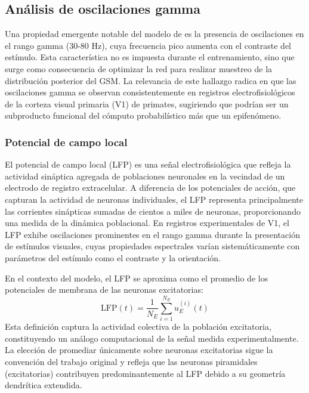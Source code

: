 \subsection{Análisis de oscilaciones gamma}
  \label{subsec:res_gamma}
  Una propiedad emergente notable del modelo de \citet{echeveste2020cortical} es la presencia de
  oscilaciones en el rango gamma (30-80 Hz), cuya frecuencia pico aumenta con el contraste del
  estímulo. Esta característica no es impuesta durante el entrenamiento, sino que surge como
  consecuencia de optimizar la red para realizar muestreo de la distribución posterior del
  \acrshort{GSM}. La relevancia de este hallazgo radica en que las oscilaciones gamma se observan
  consistentemente en registros electrofisiológicos de la corteza visual primaria (\acrshort{V1}) de
  primates, sugiriendo que podrían ser un subproducto funcional del cómputo probabilístico más que un
  epifenómeno.

  \subsubsection{Potencial de campo local}
  El potencial de campo local (\acrshort{LFP}) es una señal electrofisiológica que refleja la 
  actividad sináptica agregada de poblaciones neuronales en la vecindad de un electrodo de registro 
  extracelular. A diferencia de los potenciales de acción, que capturan la actividad de neuronas 
  individuales, el \acrshort{LFP} representa principalmente las corrientes sinápticas sumadas de 
  cientos a miles de neuronas, proporcionando una medida de la dinámica poblacional. En registros 
  experimentales de \acrshort{V1}, el \acrshort{LFP} exhibe oscilaciones prominentes en el rango 
  gamma durante la presentación de estímulos visuales, cuyas propiedades espectrales varían 
  sistemáticamente con parámetros del estímulo como el contraste y la orientación.

  En el contexto del modelo, el \acrshort{LFP} se aproxima como el promedio de los potenciales de 
  membrana de las neuronas excitatorias:
  \begin{equation}
      \text{LFP}(t) = \frac{1}{N_E} \sum_{i=1}^{N_E} u_E^{(i)}(t)
  \end{equation}
  Esta definición captura la actividad colectiva de la población excitatoria, constituyendo un 
  análogo computacional de la señal medida experimentalmente. La elección de promediar únicamente 
  sobre neuronas excitatorias sigue la convención del trabajo original y refleja que las neuronas 
  piramidales (excitatorias) contribuyen predominantemente al \acrshort{LFP} debido a su geometría 
  dendrítica extendida.


